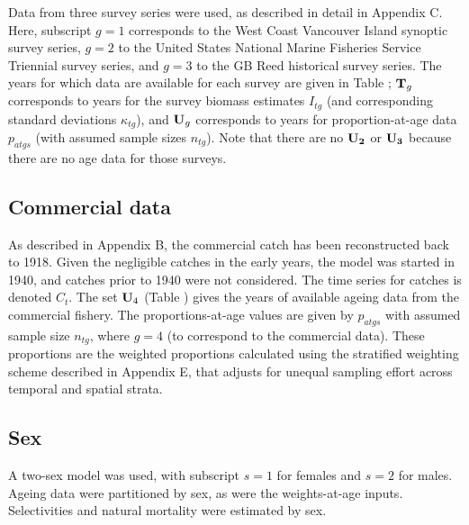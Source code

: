 Data from three survey series were used, as described in detail in Appendix C. Here, subscript $g=1$ corresponds to the West Coast Vancouver Island synoptic survey series, $g=2$ to the United States National Marine Fisheries Service Triennial survey series, and $g=3$ to the GB Reed historical survey series. The years for which data are available for each survey are given in Table ; ${\bf T}_g$ corresponds to years for the survey biomass estimates $I_{tg}$ (and corresponding standard deviations $\kappa_{tg}$), and ${\bf U}_g$ corresponds to years for proportion-at-age data $p_{atgs}$ (with assumed sample sizes $n_{tg}$). Note that there are no ${\bf U_2}$ or ${\bf U_3}$ because there are no age data for those surveys.


\subsection{Commercial data}

As described in Appendix B, the commercial catch has been reconstructed back to 1918. Given the negligible catches in the early years, the model was started in 1940, and catches prior to 1940 were not considered. The time series for catches is denoted $C_t$. The set ${\bf U}_4$ (Table ) gives the years of available ageing data from the commercial fishery. The proportions-at-age values are given by $p_{atgs}$ with assumed sample size $n_{tg}$, where $g=4$ (to correspond to the commercial data). These proportions are the weighted proportions calculated using the stratified weighting scheme described in Appendix E, that adjusts for unequal sampling effort across temporal and spatial strata.

\subsection{Sex}

A two-sex model was used, with subscript $s=1$ for females and $s=2$ for males. Ageing data were partitioned by sex, as were the weights-at-age inputs. Selectivities and natural mortality were estimated by sex.


